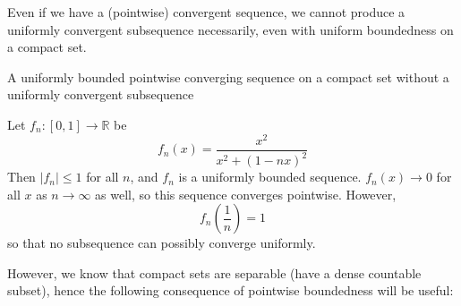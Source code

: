 Even if we have a (pointwise) convergent sequence, we cannot produce a uniformly convergent subsequence necessarily, even with uniform boundedness on a compact set.

\begin{example} A uniformly bounded pointwise converging sequence on a compact set without a uniformly convergent subsequence

    Let $f_n: [0, 1] \rightarrow \mathbb{R}$ be
    \[f_n(x) = \frac{x^2}{x^2+(1-nx)^2}\]
    Then $|f_n| \leq 1$ for all $n$, and $f_n$ is a uniformly bounded sequence. $f_n(x) \to 0$ for all $x$ as $n \to \infty$ as well, so this sequence converges pointwise.
    However,
    \[f_n\left(\frac{1}{n}\right) = 1\]
    so that no subsequence can possibly converge uniformly.
\end{example}

However, we know that compact sets are separable (have a dense countable subset), hence the following consequence of pointwise boundedness will be useful:

